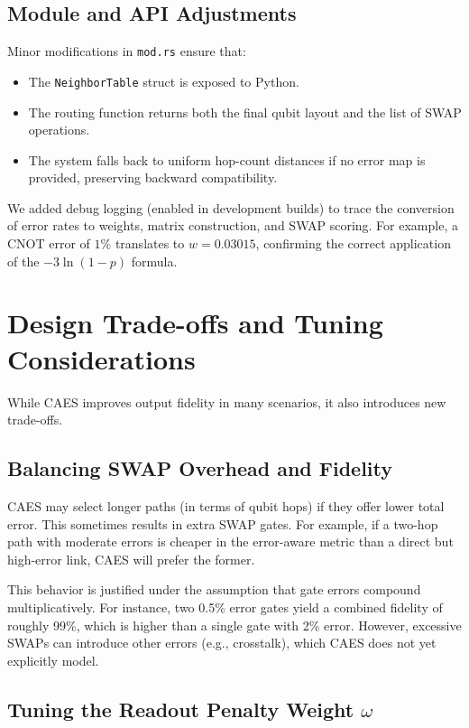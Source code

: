 \documentclass[conference]{IEEEtran}
\begin{document}
\subsection{Module and API Adjustments}

Minor modifications in \texttt{mod.rs} ensure that:
\begin{itemize}
    \item The \texttt{NeighborTable} struct is exposed to Python.
    \item The routing function returns both the final qubit layout and the list of SWAP operations.
    \item The system falls back to uniform hop-count distances if no error map is provided, preserving backward compatibility.
\end{itemize}

We added debug logging (enabled in development builds) to trace the conversion of error rates to weights, matrix construction, and SWAP scoring. For example, a CNOT error of $1\%$ translates to $w = 0.03015$, confirming the correct application of the $-3\ln(1 - p)$ formula.



\section{Design Trade-offs and Tuning Considerations}

While CAES improves output fidelity in many scenarios, it also introduces new trade-offs.

\subsection{Balancing SWAP Overhead and Fidelity}

CAES may select longer paths (in terms of qubit hops) if they offer lower total error. This sometimes results in extra SWAP gates. For example, if a two-hop path with moderate errors is cheaper in the error-aware metric than a direct but high-error link, CAES will prefer the former.

This behavior is justified under the assumption that gate errors compound multiplicatively. For instance, two 0.5\% error gates yield a combined fidelity of roughly 99\%, which is higher than a single gate with 2\% error. However, excessive SWAPs can introduce other errors (e.g., crosstalk), which CAES does not yet explicitly model.

\subsection{Tuning the Readout Penalty Weight \texorpdfstring{$\omega$}{omega}}
\end{document}
